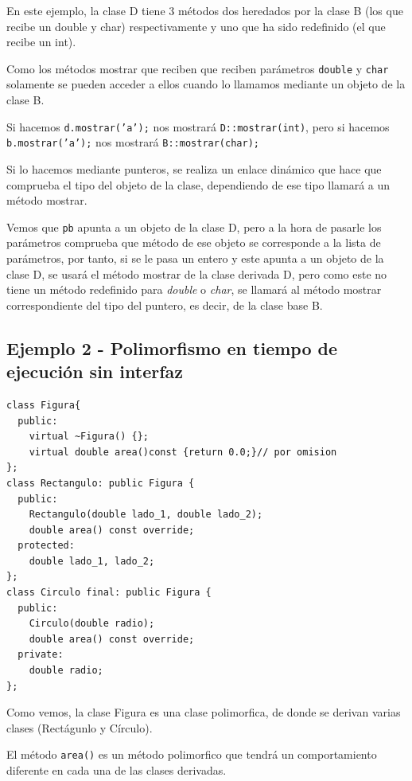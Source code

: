 En este ejemplo, la clase D tiene 3 métodos dos heredados por la clase B (los que recibe un double y char) respectivamente y uno que ha sido redefinido (el que recibe un int).

Como los métodos mostrar que reciben que reciben parámetros \texttt{double}  y \texttt{char} solamente se pueden acceder a ellos cuando lo llamamos mediante un objeto de la clase B.

Si hacemos \texttt{d.mostrar('a');} nos mostrará \texttt{D::mostrar(int)}, pero si hacemos \texttt{b.mostrar(’a’);} nos mostrará \texttt{B::mostrar(char);} 

Si lo hacemos mediante punteros, se realiza un enlace dinámico que hace que comprueba el tipo del objeto de la clase, dependiendo de ese tipo llamará a un método mostrar.

Vemos que \texttt{pb} apunta a un objeto de la clase D, pero a la hora de pasarle los parámetros comprueba que método de ese objeto se corresponde a la lista de parámetros, por tanto, si se le pasa un entero y este apunta a un objeto de la clase D, se usará el método mostrar de la clase derivada D, pero como este no tiene un método redefinido para \textit{double} o \textit{char}, se llamará al método mostrar correspondiente del tipo del puntero, es decir, de la clase base B.

\subsection{Ejemplo 2 - Polimorfismo en tiempo de ejecución sin interfaz}

\begin{center}
	\begin{lstlisting}[frame=single]
class Figura{
  public:
    virtual ~Figura() {};
    virtual double area()const {return 0.0;}// por omision 
};
class Rectangulo: public Figura {
  public:
    Rectangulo(double lado_1, double lado_2);
    double area() const override;
  protected:
    double lado_1, lado_2;
};
class Circulo final: public Figura {
  public:
    Circulo(double radio);
    double area() const override;
  private:
    double radio;
};		
	\end{lstlisting}
\end{center}

Como vemos, la clase Figura es una clase polimorfica, de donde se derivan varias clases (Rectágunlo y Círculo).

El método \texttt{area()} es un método polimorfico que tendrá un comportamiento diferente en cada una de las clases derivadas.

